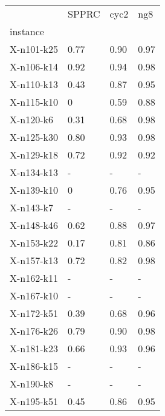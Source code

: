 \begin{tabular}{llll}
\toprule
{} & SPPRC & cyc2 &  ng8 \\
instance   &       &      &      \\
\midrule
X-n101-k25 &  0.77 & 0.90 & 0.97 \\
X-n106-k14 &  0.92 & 0.94 & 0.98 \\
X-n110-k13 &  0.43 & 0.87 & 0.95 \\
X-n115-k10 &     0 & 0.59 & 0.88 \\
X-n120-k6  &  0.31 & 0.68 & 0.98 \\
X-n125-k30 &  0.80 & 0.93 & 0.98 \\
X-n129-k18 &  0.72 & 0.92 & 0.92 \\
X-n134-k13 &     - &    - &    - \\
X-n139-k10 &     0 & 0.76 & 0.95 \\
X-n143-k7  &     - &    - &    - \\
X-n148-k46 &  0.62 & 0.88 & 0.97 \\
X-n153-k22 &  0.17 & 0.81 & 0.86 \\
X-n157-k13 &  0.72 & 0.82 & 0.98 \\
X-n162-k11 &     - &    - &    - \\
X-n167-k10 &     - &    - &    - \\
X-n172-k51 &  0.39 & 0.68 & 0.96 \\
X-n176-k26 &  0.79 & 0.90 & 0.98 \\
X-n181-k23 &  0.66 & 0.93 & 0.96 \\
X-n186-k15 &     - &    - &    - \\
X-n190-k8  &     - &    - &    - \\
X-n195-k51 &  0.45 & 0.86 & 0.95 \\
\bottomrule
\end{tabular}

